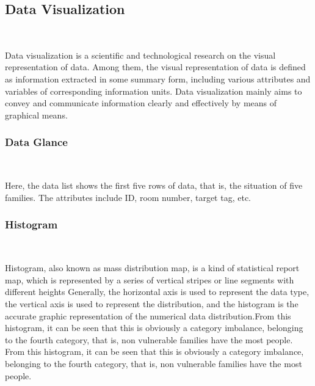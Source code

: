 \subsection{Data Visualization}
\

Data visualization is a scientific and technological research on the visual representation of data. Among them, the visual representation of data is defined as information extracted in some summary form, including various attributes and variables of corresponding information units. Data visualization mainly aims to convey and communicate information clearly and effectively by means of graphical means.

\subsubsection{Data Glance}
\

Here, the data list shows the first five rows of data, that is, the situation of five families. The attributes include ID, room number, target tag, etc.





\subsubsection{Histogram}
\

Histogram, also known as mass distribution map, is a kind of statistical report map, which is represented by a series of vertical stripes or line segments with different heights Generally, the horizontal axis is used to represent the data type, the vertical axis is used to represent the distribution, and the histogram is the accurate graphic representation of the numerical data distribution.From this histogram, it can be seen that this is obviously a category imbalance, belonging to the fourth category, that is, non vulnerable families have the most people. From this histogram, it can be seen that this is obviously a category imbalance, belonging to the fourth category, that is, non vulnerable families have the most people.


